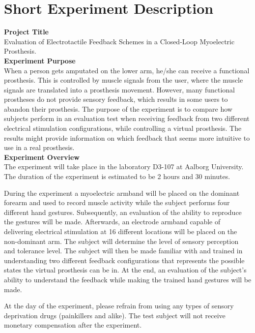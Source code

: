 \section{Short Experiment Description} \label{SED}

\noindent\textbf{Project Title} \\
Evaluation of Electrotactile Feedback Schemes in a
Closed-Loop Myoelectric Prosthesis.
\\

\noindent\textbf{Experiment Purpose} \\
When a person gets amputated on the lower arm, he/she can receive a functional prosthesis. This is controlled by muscle signals from the user, where the muscle signals are translated into a prosthesis movement. However, many functional prostheses do not provide sensory feedback, which results in some users to abandon their prosthesis. The purpose of the experiment is to compare how subjects perform in an evaluation test when receiving feedback from two different electrical stimulation configurations, while controlling a virtual prosthesis. The results might provide information on which feedback that seems more intuitive to use in a real prosthesis.  
\\ 

\noindent\textbf{Experiment Overview} \\
The experiment will take place in the laboratory D3-107 at Aalborg University. The duration of the experiment is estimated to be 2 hours and 30 minutes. 

During the experiment a myoelectric armband will be placed on the dominant forearm and used to record muscle activity while the subject performs four different hand gestures. Subsequently, an evaluation of the ability to reproduce the gestures will be made. Afterwards, an electrode armband capable of delivering electrical stimulation at 16 different locations will be placed on the non-dominant arm. The subject will determine the level of sensory perception and tolerance level. The subject will then be made familiar with and trained in understanding two different feedback configurations that represents the possible states the virtual prosthesis can be in. At the end, an evaluation of the subject’s ability to understand the feedback while making the trained hand gestures will be made. 

At the day of the experiment, please refrain from using any types of sensory deprivation drugs (painkillers and alike). The test subject will not receive monetary compensation after the experiment. 
